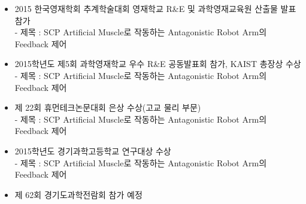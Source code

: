 \begin{researches}
\begin{itemize}
\item{2015 한국영재학회 추계학술대회 영재학교 R\&E 및 과학영재교육원 산출물 발표 참가}
\\ - 제목 : SCP Artificial Muscle로 작동하는 Antagonistic Robot Arm의 Feedback 제어
\item{2015학년도 제5회 과학영재학교 우수 R\&E 공동발표회 참가, KAIST 총장상 수상}
\\ - 제목 : SCP Artificial Muscle로 작동하는 Antagonistic Robot Arm의 Feedback 제어
\item{제 22회 휴먼테크논문대회 은상 수상(고교 물리 부문)}
\\ - 제목 : SCP Artificial Muscle로 작동하는 Antagonistic Robot Arm의 Feedback 제어
\item{2015학년도 경기과학고등학교 연구대상 수상}
\\ - 제목 : SCP Artificial Muscle로 작동하는 Antagonistic Robot Arm의 Feedback 제어
\item{제 62회	경기도과학전람회 참가 예정}
\end{itemize}
\end{researches}
